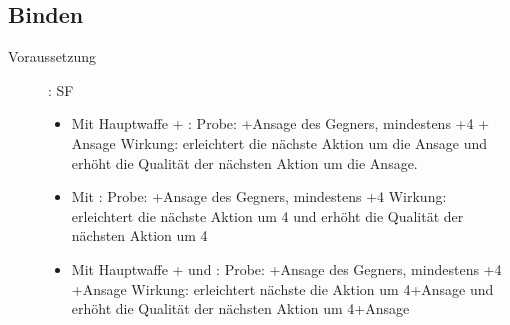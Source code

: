 \subsection{Binden}
\label{reaktion.binden}
\begin{description}
    \item[Voraussetzung]:
        SF 
        \begin{itemize}
            \item
                Mit Hauptwaffe + :\newline
                Probe: +Ansage des Gegners, mindestens +4 + Ansage\newline
                Wirkung: erleichtert die nächste Aktion um die Ansage und erhöht die Qualität der nächsten Aktion um die Ansage.
            \item
                Mit :\newline
                Probe: +Ansage des Gegners, mindestens +4\newline
                Wirkung: erleichtert die nächste Aktion um 4 und erhöht die Qualität der nächsten Aktion um 4
            \item
                Mit Hauptwaffe +  und :\newline
                Probe: +Ansage des Gegners, mindestens +4 +Ansage\newline
                Wirkung: erleichtert nächste die Aktion um 4+Ansage und erhöht die Qualität der nächsten Aktion um 4+Ansage
        \end{itemize}
\end{description}
